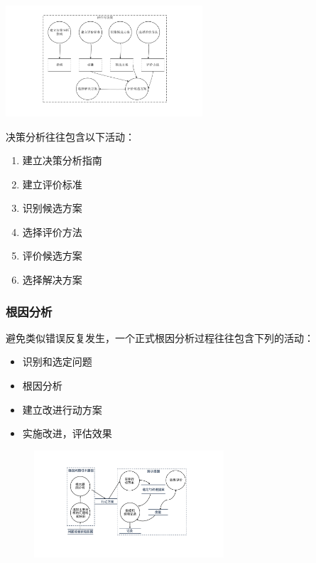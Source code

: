 \begin{table}
    \centering
    \vspace{-1.5em}
    \includegraphics[width=0.55\textwidth]{images/决策分析活动.pdf}
    \vspace{-6.5em}
\end{table}
决策分析往往包含以下活动：
\begin{enumerate}[label=\arabic*.]
    \item 建立决策分析指南
    \item 建立评价标准
    \item 识别候选方案
    \item 选择评价方法
    \item 评价候选方案
    \item 选择解决方案
\end{enumerate}

\subsubsection{根因分析}
避免类似错误反复发生，一个正式根因分析过程往往包含下列的活动：
\vspace{-0.8em}
\begin{multicols}{4}
    \begin{itemize}
        \item 识别和选定问题
        \item 根因分析
        \item 建立改进行动方案
        \item 实施改进，评估效果
    \end{itemize}
\end{multicols}
\vspace{-1em}

\begin{figure}[H]
    \vspace{-0.5em}
	\centering
	\includegraphics[width=0.63\textwidth]{images/根因分析活动.pdf}
    \vspace{-1em}
\end{figure}
\vspace{-1em}

